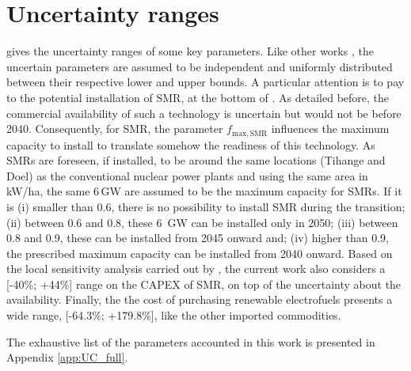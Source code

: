 \section{Uncertainty ranges}
\label{sec:cs:uncertainty}
 gives the uncertainty ranges of some key parameters. Like other works \cite{li2019renewables,coppitters2021robust}, the uncertain parameters are assumed to be independent and uniformly distributed between their respective lower and upper bounds. A particular attention is to pay to the potential installation of \gls{SMR}, at the bottom of . As detailed before, the commercial availability of such a technology is uncertain but would not be before 2040. Consequently, for \gls{SMR}, the parameter $f_{\mathrm{max,SMR}}$ influences the maximum capacity to install to translate somehow the readiness of this technology. As SMRs are foreseen, if installed, to be around the same locations (\ie Tihange and Doel) as the conventional nuclear power plants and using the same area in kW/ha, the same 6\,GW are assumed to be the maximum capacity for SMRs. If it is (i) smaller than 0.6, there is no possibility to install \gls{SMR} during the transition; (ii) between 0.6 and 0.8, these 6~GW can be installed only in 2050; (iii) between 0.8 and 0.9, these can be installed from 2045 onward and; (iv) higher than 0.9, the prescribed maximum capacity can be installed from 2040 onward. Based on the local sensitivity analysis carried out by \citet{PATHS2050}, the current work also considers a [-40\%; +44\%] range on the CAPEX of SMR, on top of the uncertainty about the availability. Finally, the the cost of purchasing renewable electrofuels presents a wide range, [-64.3\%; +179.8\%], like the other imported commodities.

The exhaustive list of the parameters accounted in this work is presented in Appendix \ref{app:UC_full}.

